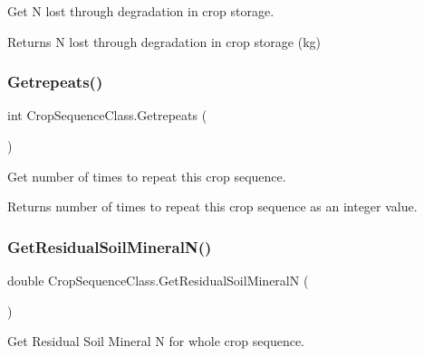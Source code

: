 Get N lost through degradation in crop storage. 

\begin{DoxyReturn}{Returns}
N lost through degradation in crop storage (kg) 
\end{DoxyReturn}
\mbox{\label{class_crop_sequence_class_a07ab6e17af1240ac95f3cbd4126eacc8}} 
\subsubsection{\texorpdfstring{Getrepeats()}{Getrepeats()}}
{\footnotesize\ttfamily int Crop\+Sequence\+Class.\+Getrepeats (\begin{DoxyParamCaption}{ }\end{DoxyParamCaption})\hspace{0.3cm}{\ttfamily [inline]}}



Get number of times to repeat this crop sequence. 

\begin{DoxyReturn}{Returns}
number of times to repeat this crop sequence as an integer value. 
\end{DoxyReturn}
\mbox{\label{class_crop_sequence_class_a3401eac2451cc44771fdd81889e201c2}} 
\subsubsection{\texorpdfstring{GetResidualSoilMineralN()}{GetResidualSoilMineralN()}\hspace{0.1cm}{\footnotesize\ttfamily [1/2]}}
{\footnotesize\ttfamily double Crop\+Sequence\+Class.\+Get\+Residual\+Soil\+MineralN (\begin{DoxyParamCaption}{ }\end{DoxyParamCaption})\hspace{0.3cm}{\ttfamily [inline]}}



Get Residual Soil Mineral N for whole crop sequence. 

\mbox{\label{class_crop_sequence_class_a2347aff3c6945f3394ba5ca4ec8ea204}} 
